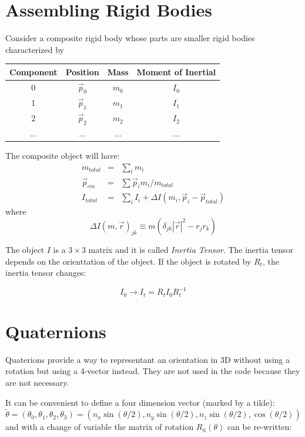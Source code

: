 \documentclass[12pt]{article}
\begin{document}
\section{Assembling Rigid Bodies}

Consider a composite rigid body whose parts are smaller rigid bodies characterized by
\begin{center}
\begin{tabular}{cccc} \hline
Component & Position & Mass & Moment of Inertial \\ \hline
0 & $\vec p_0$ & $m_0$ & $I_0$ \\ 
1 & $\vec p_1$ & $m_1$ & $I_1$ \\ 
2 & $\vec p_2$ & $m_2$ & $I_2$ \\ 
... & ... & ... & ... \\ \hline
\end{tabular}
\end{center}

The composite object will have:
\begin{eqnarray}
m_{total} &=& \sum_i m_i \\
\vec p_{cm} &=& \sum \vec p_i m_i/m_{total} \\
I_{total} &=& \sum_i I_i + \Delta I(m_i, \vec p_i - \vec p_{total})
\end{eqnarray}
where
\begin{equation}
\Delta I(m, \vec r)_{jk} \equiv m (\delta_{jk} |\vec r|^2 - r_j r_k)
\end{equation}

The object $I$ is a $3\times 3$ matrix and it is called {\it Inertia Tensor}. The inertia tensor depends on the orienttation of the object. If the object is rotated by $R_t$, the inertia tensor changes:

\begin{equation}
I_0 \rightarrow I_t = R_t I_0 R_t^{-1}
\end{equation}

\section{Quaternions}

Quaterions provide a way to representant an orientation in 3D without using a rotation but using a 4-vector instead. They are not used in the code because they are not necessary.

It can be convenient to define a four dimension vector (marked by a tilde):
\begin{equation}
\tilde \theta = (\theta_0,\theta_1,\theta_2,\theta_3) = (n_x \sin(\theta/2), n_y \sin(\theta/2), n_z \sin(\theta/2),\cos(\theta/2))
\label{quaternion}
\end{equation}
and with a change of variable the matrix of rotation $R_{\hat n}(\theta)$ can be re-written:
\end{document}
